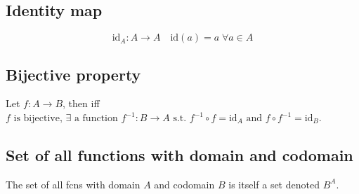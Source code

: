\subsection{Identity map}
\begin{definition}
    \[
    \text{id}_A: A \to A \quad \text{id}(a) = a \; \forall a \in A
    \]
\end{definition}

\subsection{Bijective property}
\begin{definition}
    Let \( f: A \to B \), then iff \( f \text{ is bijective, } \exists \text{ a function } f^{-1}: B \to A \text{ s.t. } f^{-1} \circ f = \text{id}_A \text{ and } f \circ f^{-1} = \text{id}_B \).
\end{definition}

\subsection{Set of all functions with domain and codomain}
\begin{definition}
    The set of all fcns with domain $A$ and codomain $B$ is itself a set denoted $B^A$.
\end{definition}

